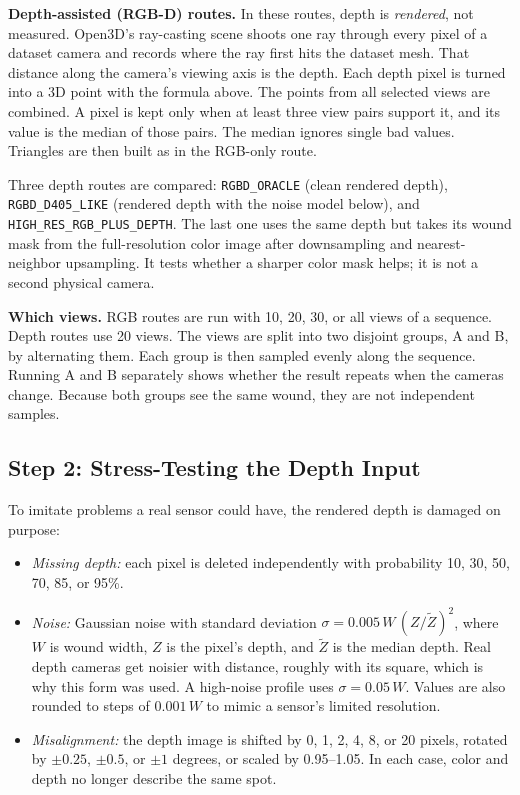 \documentclass[conference]{IEEEtran}
\begin{document}
\textbf{Depth-assisted (RGB-D) routes.} In these routes, depth is
\emph{rendered}, not measured. Open3D's ray-casting scene shoots one ray
through every pixel of a dataset camera and records where the ray first
hits the dataset mesh. That distance along the camera's viewing axis is the
depth. Each depth pixel is turned into a 3D point with the formula above.
The points from all selected views are combined. A pixel is kept only when
at least three view pairs support it, and its value is the median of those
pairs. The median ignores single bad values. Triangles are then built as in
the RGB-only route.

Three depth routes are compared: \texttt{RGBD\_ORACLE} (clean rendered
depth), \texttt{RGBD\_D405\_LIKE} (rendered depth with the noise model
below), and \texttt{HIGH\_RES\_RGB\_PLUS\_DEPTH}. The last one uses the same
depth but takes its wound mask from the full-resolution color image after
downsampling and nearest-neighbor upsampling. It tests whether a sharper
color mask helps; it is not a second physical camera.

\textbf{Which views.} RGB routes are run with 10, 20, 30, or all views of a
sequence. Depth routes use 20 views. The views are split into two disjoint
groups, A and B, by alternating them. Each group is then sampled evenly
along the sequence. Running A and B separately shows whether the result
repeats when the cameras change. Because both groups see the same wound,
they are not independent samples.

\subsection{Step 2: Stress-Testing the Depth Input}

To imitate problems a real sensor could have, the rendered depth is damaged
on purpose:
\begin{itemize}
\item \emph{Missing depth:} each pixel is deleted independently with
probability 10, 30, 50, 70, 85, or 95\%.
\item \emph{Noise:} Gaussian noise with standard deviation
$\sigma = 0.005\,W\,(Z/\tilde Z)^2$, where $W$ is wound width, $Z$ is the
pixel's depth, and $\tilde Z$ is the median depth. Real depth cameras get
noisier with distance, roughly with its square, which is why this form was
used. A high-noise profile uses $\sigma = 0.05\,W$. Values are also rounded
to steps of $0.001\,W$ to mimic a sensor's limited resolution.
\item \emph{Misalignment:} the depth image is shifted by 0, 1, 2, 4, 8, or 20
pixels, rotated by $\pm0.25$, $\pm0.5$, or $\pm1$ degrees, or scaled by
0.95--1.05. In each case, color and depth no longer describe the same
spot.
\end{itemize}
\end{document}
